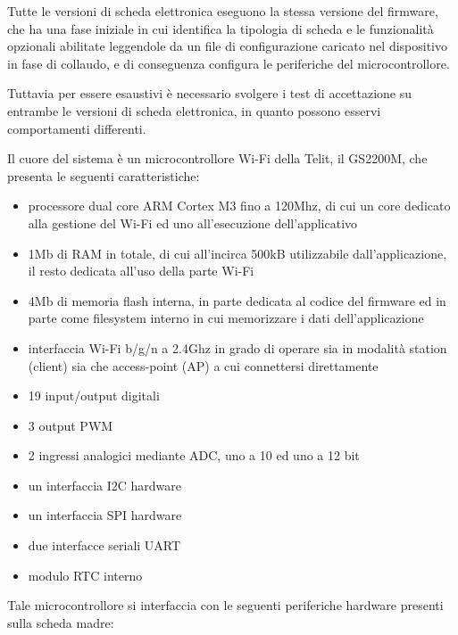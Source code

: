 \documentclass[a4paper,titlepage]{article}
\begin{document}
Tutte le versioni di scheda elettronica eseguono la stessa versione del firmware,
che ha una fase iniziale in cui identifica la tipologia di scheda e le funzionalità
opzionali abilitate leggendole da un file di configurazione caricato nel dispositivo
in fase di collaudo, e di conseguenza configura le periferiche del microcontrollore.

Tuttavia per essere esaustivi è necessario svolgere i test di accettazione su entrambe
le versioni di scheda elettronica, in quanto possono esservi comportamenti differenti.

Il cuore del sistema è un microcontrollore Wi-Fi della Telit, il GS2200M, che presenta
le seguenti caratteristiche:

\begin{itemize}
    \item processore dual core ARM Cortex M3 fino a 120Mhz, di cui un core dedicato
        alla gestione del Wi-Fi ed uno all'esecuzione dell'applicativo
    \item 1Mb di RAM in totale, di cui all'incirca 500kB utilizzabile dall’applicazione,
        il resto dedicata all'uso della parte Wi-Fi
    \item 4Mb di memoria flash interna, in parte dedicata al codice del firmware ed
        in parte come filesystem interno in cui memorizzare i dati dell'applicazione
    \item interfaccia Wi-Fi b/g/n a 2.4Ghz in grado di operare sia in modalità station
        (client) sia che access-point (AP) a cui connettersi direttamente
    \item 19 input/output digitali
    \item 3 output PWM
    \item 2 ingressi analogici mediante ADC, uno a 10 ed uno a 12 bit
    \item un interfaccia I2C hardware
    \item un interfaccia SPI hardware
    \item due interfacce seriali UART
    \item modulo RTC interno
\end{itemize}

Tale microcontrollore si interfaccia con le seguenti periferiche hardware presenti
sulla scheda madre:
\end{document}
